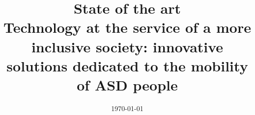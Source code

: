 \newcommand{\addentry}[3]{\small{#1} & \small{#2} & \small{\href{mailto:#3}{#3}}\\}

\def\projecttitle{
    Technology at the service of a more inclusive society: innovative solutions dedicated to the mobility of ASD people
}

\def\varkeywords{
    AI; ASD; intelligent mobility; data analysis ; IoT
}

\def\students{
    \addentry{Bakri}{Sara}{bakri@insa-toulouse.fr}
    \addentry{Boireau-Devier}{Jeremy}{boireau-@insa-toulouse.fr}
    \addentry{Cabanillas-Navarro}{Laura}{lcabanil@insa-toulouse.fr}
    \addentry{Clermont-Pezous}{Alexandre}{clermont@insa-toulouse.fr}
    \addentry{Criquet}{Apollinaire}{criquet@insa-toulouse.fr}
    \addentry{Gautheron}{Thibault}{tgauther@insa-toulouse.fr}
    \addentry{Saint-Loubert}{Jean-Yves}{saint-lo@insa-toulouse.fr}   
}

\def\tutors{
    \addentry{Guermouche}{Nawal}{nawal.guermouche@laas.fr}
}

\title{\vspace{1.5cm}State of the art \\ \vspace{0.25cm} \LARGE{\textbf{\projecttitle}}}
\author{}
\date{\today}
